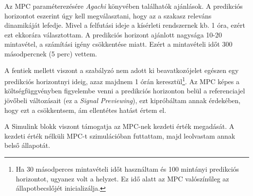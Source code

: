 Az MPC paraméterezésére \textit{Agachi \cite{romanMPC_Agachi}} könyvében találhatók ajánlások. A predikciós horizontot eszerint úgy kell megválasztani, hogy az a szakasz releváns dinamikáját lefedje. Mivel a felfutási ideje a kísérleti rendszernek kb. 1 óra, ezért ezt ekkorára választottam. A predikciós horizont ajánlott nagysága 10-20 mintavétel, a számítási igény csökkentése miatt. Ezért a mintavételi időt 300 másodpercnek (5 perc) vettem.

A fentiek mellett viszont a szabályzó nem adott ki beavatkozójelet egészen egy predikciós horizontnyi ideig, azaz majdnem 1 órán keresztül\footnote{Ha 30 másodperces mintavételi időt használtam és 100 mintányi predikciós horizontot, ugyanez volt a helyzet. Ez idő alatt az MPC valószínűleg az állapotbecslőjét inicializálja.}. Az MPC képes a költségfüggvényben figyelembe venni a predikciós horizonton belül a referenciajel jövőbeli változásait (ez a \textit{Signal Previewing}), ezt kipróbáltam annak érdekében, hogy ezt a  csökkentsem, ám ellentétes hatást értem el.

A Simulink blokk viszont támogatja az MPC-nek kezdeti érték megadását. A kezdeti érték nélküli MPC-t szimulációban futtattam, majd leolvastam annak belső állapotát.
